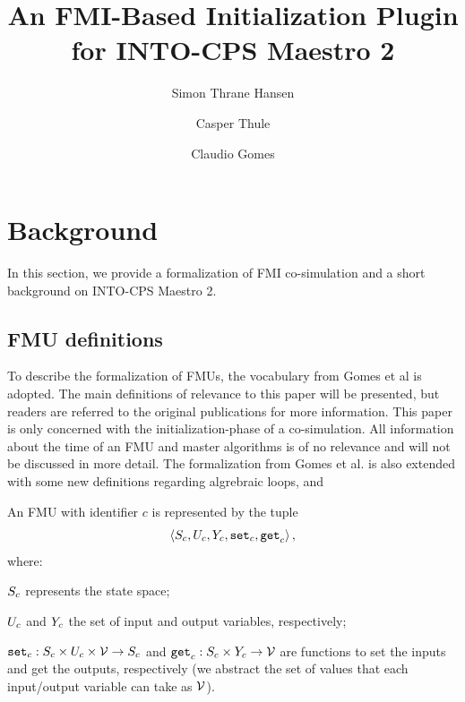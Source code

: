 \documentclass[runningheads]{llncs}
\begin{document}
%
\title{An FMI-Based Initialization Plugin for INTO-CPS Maestro 2}
%
%
\author{Simon Thrane Hansen \and
Casper Thule \and
Claudio Gomes }
%
%
%
\maketitle              %
%






\section{Background}\label{sc:background}
In this section, we provide a formalization of FMI co-simulation and a short background on INTO-CPS Maestro 2.

\subsection{FMU definitions}
To describe the formalization of FMUs, the vocabulary from Gomes et al\cite{gomes_lucio_vangheluwe_2019, Gomes2018} is adopted. The main definitions of relevance to this paper will be presented, but readers are referred to the original publications for more information. This paper is only concerned with the initialization-phase of a co-simulation. All information about the time of an FMU and master algorithms is of no relevance and will not be discussed in more detail. 
The formalization from Gomes et al. is also extended with some new definitions regarding algrebraic loops, and 
\begin{definition}[FMU]\label{def:fmu}
  An FMU with identifier $c$ is represented by the tuple   
  $$ \left\langle S_{c}, U_{c}, Y_{c}, \mathtt{set}_{c}, \mathtt{get}_{c} \right\rangle ,$$
  where:
  \begin{inparadesc}
    \item $S_{c}$ represents the state space;
    \item $U_{c}$ and $Y_{c}$ the set of input and output variables, respectively;
    \item $\mathtt{set}_{c} : S_{c} \times U_{c} \times \mathcal{V} \to S_{c}$ and $\mathtt{get}_{c}: S_{c} \times Y_{c} \to \mathcal{V}$ are functions to set the inputs and get the outputs, respectively (we abstract the set of values that each input/output variable can take as $\mathcal{V}$).
  \end{inparadesc}
\end{definition}
\end{document}
